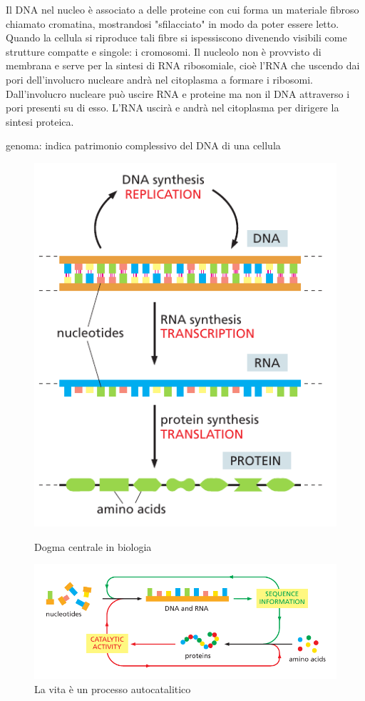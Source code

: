 Il DNA nel nucleo è associato a delle proteine con cui forma un materiale fibroso chiamato cromatina, mostrandosi "sfilacciato" in modo da poter essere letto. Quando la cellula si riproduce tali fibre si ispessiscono divenendo visibili come strutture compatte e singole: i cromosomi. Il nucleolo non è provvisto di membrana e serve per la sintesi di RNA ribosomiale, cioè l'RNA che uscendo dai pori dell'involucro nucleare andrà nel citoplasma a formare i ribosomi. Dall'involucro nucleare può uscire RNA e proteine ma non il DNA attraverso i pori presenti su di esso. L'RNA uscirà e andrà nel citoplasma per dirigere la sintesi proteica.

genoma: indica patrimonio complessivo del DNA di una cellula

\par

\begin{figure}[!htb]
	\includegraphics[scale=0.45]{images/central-dogma.png}
	\caption{Dogma centrale in biologia}\label{fig:awesome_image1}
	\endminipage\hfill
	\includegraphics[width=\linewidth]{images/vita-autocatalitica.png}
	\caption{La vita è un processo autocatalitico}\label{fig:awesome_image2}
	\endminipage\hfill
\end{figure}


